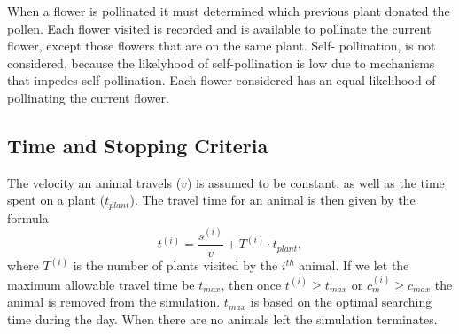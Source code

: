 \documentclass{tran-l}
\theoremstyle{definition}
\theoremstyle{remark}
\numberwithin{equation}{subsection}
\begin{document}
When a flower is pollinated it must determined
which previous plant donated the pollen. Each flower visited is
recorded and is available to pollinate the current flower, except those flowers
that are on the same plant. Self- pollination, is not considered, because the
likelyhood of self-pollination is low due to mechanisms that impedes
self-pollination. Each flower considered has an equal likelihood of pollinating
the current flower.

\subsection{Time and Stopping Criteria}
The velocity an animal travels ($v$) is assumed to be constant, as well as the time spent on a plant
($t_{plant}$).  The travel time for an animal is then given by the
formula
\[
	t^{\left(i\right)} = \frac{s^{\left(i\right)}}{v} + T^{\left(i\right)}
\cdot t_{plant},
\]
where $T^{\left(i\right)}$ is the number of plants visited by the $i^{th}$
animal. If we let the maximum allowable travel time be $t_{max}$, then once
$t^{\left(i\right)} \geq t_{max}$ or $c^{\left(i\right)}_m \geq c_{max}$ the
animal is removed from the simulation. $t_{max}$ is based on the optimal searching time during the day.  When there are no animals left the simulation terminates.
\end{document}
